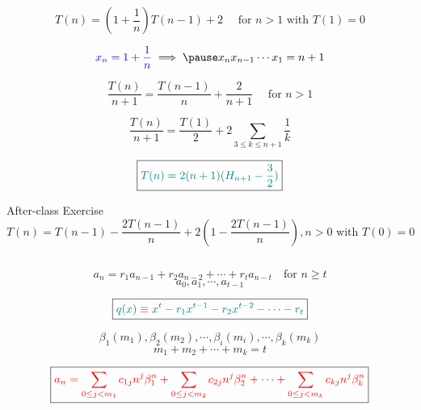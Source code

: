 \begin{frame}{}
  \[
    T(n) = (1 + \frac{1}{n}) T(n-1) + 2  \quad \text{ for } n > 1 \text{ with } T(1) = 0
  \]

  \pause
  \[
    \blue{x_n = 1 + \frac{1}{n}} \implies \pause x_n x_{n-1} \cdots x_1 = n + 1
  \]

  \pause
  \[
    \frac{T(n)}{n+1} = \frac{T(n-1)}{n} + \frac{2}{n+1} \quad \text{ for } n > 1
  \]

  \pause
  \vspace{0.30cm}
  \[
    \frac{T(n)}{n+1} = \frac{T(1)}{2} + 2 \sum_{3 \le k \le n+1} \frac{1}{k}
  \]

  \pause
  \vspace{0.30cm}
  \[
    \boxed{\textcolor{teal}{T(n) = 2(n+1) (H_{n+1} - \frac{3}{2})}}
  \]
\end{frame}

\begin{frame}{}
  \begin{exampleblock}{After-class Exercise}
    \[
      T(n) = T(n-1) - \frac{2T(n-1)}{n} + 2\left(1 - \frac{2T(n-1)}{n}\right), n > 0 \text{ with } T(0) = 0
    \]
  \end{exampleblock}

  \begin{columns}
    \pause
  \end{columns}
\end{frame}

\begin{frame}{}
  \begin{theorem}
    \[
      a_n = r_1 a_{n-1} + r_2 a_{n-2} + \cdots + r_t a_{n-t} \quad \text{for } n \ge t
    \]
    \[
      a_0, a_1, \cdots, a_{t-1}
    \]

    \pause
    \[
      \boxed{\textcolor{teal}{q(x) \;\textcolor{red}{\equiv}\; x^t - r_1 x^{t-1} - r_2 x^{t-2} - \cdots - r_t}}
    \]

    \pause
    \[
      \beta_1 (m_1), \beta_2 (m_2), \cdots, \beta_i (m_i), \cdots, \beta_{k} (m_k)
    \]
    \[
      m_1 + m_2 + \cdots + m_k = t
    \]

    \pause
    \[
      \boxed{\textcolor{red}{a_n = \sum_{0 \le j < m_1} c_{1j} n^j \beta_{1}^{n} + \sum_{0 \le j < m_2} c_{2j} n^j \beta_{2}^{n} + \cdots 
	+ \sum_{0 \le j < m_k} c_{kj} n^j \beta_{k}^{n}}}
    \]
  \end{theorem}
\end{frame}

